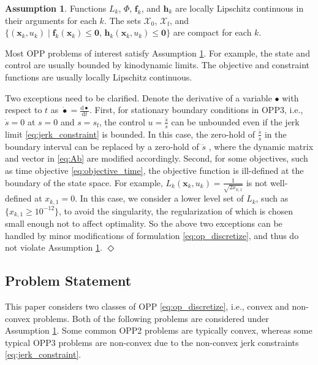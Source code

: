 \documentclass[journal]{IEEEtran}
\theoremstyle{definition}
\theoremstyle{definition}
\newtheorem{assumption}{Assumption}
\newtheorem*{remark}{Remark}
\let\oldremark\remark
\let\endoldremark\endremark
\renewenvironment{remark}
  {\oldremark}
  {\hfill$\Diamond$\endoldremark}
\renewcommand\vector[1]{\boldsymbol{#1}}
\newcommand\vf{{\vector{f}}}
\newcommand\vh{{\vector{h}}}
\newcommand\vx{{\vector{x}}}
\newcommand\vzero{{\vector{0}}}
\begin{document}
\begin{assumption}\label{assum:feasibility_smoothness}
    Functions $L_k$, $\Phi$, $\vf_k$, and $\vh_k$ are locally Lipschitz continuous in their arguments for each $k$. The sets $\mathcal{X}_0$, $\mathcal{X}_\text{f}$, and $\{(\vx_k,u_k)\mid \vf_k(\vx_k)\leq\vzero,\,\vh_k(\vx_k,u_k)\leq\vzero\}$ are compact for each $k$.
\end{assumption}

\begin{remark}
    Most OPP problems of interest satisfy Assumption \ref{assum:feasibility_smoothness}. For example, the state and control are usually bounded by kinodynamic limits. The objective and constraint functions are usually locally Lipschitz continuous.

    Two exceptions need to be clarified. Denote the derivative of a variable $\bullet$ with respect to $t$ as $\dot{\bullet}=\frac{\mathrm{d}\bullet}{\mathrm{d}t}$. First, for stationary boundary conditions in OPP3, i.e., $\dot{s}=0$ at $s=0$ and $s=s_\text{f}$, the control $u=\frac{\dddot{s}}{\dot{s}}$ can be unbounded even if the jerk limit \eqref{eq:jerk_constraint} is bounded. In this case, the zero-hold of $\frac{\dddot{s}}{\dot{s}}$ in the boundary interval can be replaced by a zero-hold of $\dddot{s}$ \cite[Section 3.2.2]{wang2026online}, where the dynamic matrix and vector in \eqref{eq:Ab} are modified accordingly. Second, for some objectives, such as time objective \eqref{eq:objective_time}, the objective function is ill-defined at the boundary of the state space. For example, $L_k(\vx_k, u_k)=\frac{1}{\sqrt{2x_{k,1}}}$ is not well-defined at $x_{k,1}=0$. In this case, we consider a lower level set of $L_k$, such as $\{x_{k,1}\geq 10^{-12}\}$, to avoid the singularity, the regularization of which is chosen small enough not to affect optimality. So the above two exceptions can be handled by minor modifications of formulation \eqref{eq:op_discretize}, and thus do not violate Assumption \ref{assum:feasibility_smoothness}.
\end{remark}

\subsection{Problem Statement}\label{subsec:problem_statement}

This paper considers two classes of OPP \eqref{eq:op_discretize}, i.e., convex and non-convex problems. Both of the following problems are considered under Assumption \ref{assum:feasibility_smoothness}. Some common OPP2 problems are typically convex, whereas some typical OPP3 problems are non-convex due to the non-convex jerk constraints \eqref{eq:jerk_constraint}.
\end{document}
